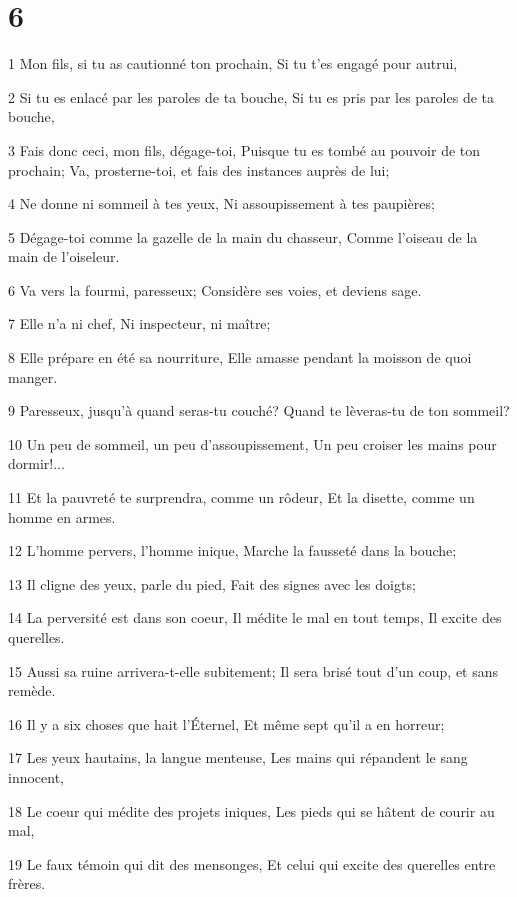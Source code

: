 \chapter{6}

\par 1 Mon fils, si tu as cautionné ton prochain, Si tu t'es engagé pour autrui,
\par 2 Si tu es enlacé par les paroles de ta bouche, Si tu es pris par les paroles de ta bouche,
\par 3 Fais donc ceci, mon fils, dégage-toi, Puisque tu es tombé au pouvoir de ton prochain; Va, prosterne-toi, et fais des instances auprès de lui;
\par 4 Ne donne ni sommeil à tes yeux, Ni assoupissement à tes paupières;
\par 5 Dégage-toi comme la gazelle de la main du chasseur, Comme l'oiseau de la main de l'oiseleur.
\par 6 Va vers la fourmi, paresseux; Considère ses voies, et deviens sage.
\par 7 Elle n'a ni chef, Ni inspecteur, ni maître;
\par 8 Elle prépare en été sa nourriture, Elle amasse pendant la moisson de quoi manger.
\par 9 Paresseux, jusqu'à quand seras-tu couché? Quand te lèveras-tu de ton sommeil?
\par 10 Un peu de sommeil, un peu d'assoupissement, Un peu croiser les mains pour dormir!...
\par 11 Et la pauvreté te surprendra, comme un rôdeur, Et la disette, comme un homme en armes.
\par 12 L'homme pervers, l'homme inique, Marche la fausseté dans la bouche;
\par 13 Il cligne des yeux, parle du pied, Fait des signes avec les doigts;
\par 14 La perversité est dans son coeur, Il médite le mal en tout temps, Il excite des querelles.
\par 15 Aussi sa ruine arrivera-t-elle subitement; Il sera brisé tout d'un coup, et sans remède.
\par 16 Il y a six choses que hait l'Éternel, Et même sept qu'il a en horreur;
\par 17 Les yeux hautains, la langue menteuse, Les mains qui répandent le sang innocent,
\par 18 Le coeur qui médite des projets iniques, Les pieds qui se hâtent de courir au mal,
\par 19 Le faux témoin qui dit des mensonges, Et celui qui excite des querelles entre frères.
